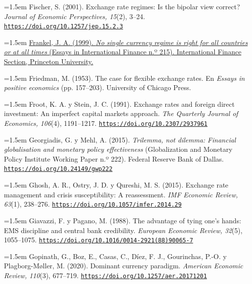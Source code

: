 \documentclass[10pt,a4paper]{article}
\begin{document}
\noindent\hangindent=1.5em Fischer, S. (2001). Exchange rate regimes: Is the bipolar view correct? \textit{Journal of Economic Perspectives, 15}(2), 3--24. \href{https://doi.org/10.1257/jep.15.2.3}{\nolinkurl{https://doi.org/10.1257/jep.15.2.3}}

\noindent\hangindent=1.5em \href{https://scholar.harvard.edu/sites/scholar.harvard.edu/files/frankel/files/nosingleexrrfprinctne215.pdf}{Frankel, J. A. (1999). \textit{No single currency regime is right for all countries or at all times} (Essays in International Finance n.º 215). International Finance Section, Princeton University.}

\noindent\hangindent=1.5em Friedman, M. (1953). The case for flexible exchange rates. En \textit{Essays in positive economics} (pp. 157--203). University of Chicago Press.

\noindent\hangindent=1.5em Froot, K. A. y Stein, J. C. (1991). Exchange rates and foreign direct investment: An imperfect capital markets approach. \textit{The Quarterly Journal of Economics, 106}(4), 1191--1217. \href{https://doi.org/10.2307/2937961}{\nolinkurl{https://doi.org/10.2307/2937961}}

\noindent\hangindent=1.5em Georgiadis, G. y Mehl, A. (2015). \textit{Trilemma, not dilemma: Financial globalisation and monetary policy effectiveness} (Globalization and Monetary Policy Institute Working Paper n.º 222). Federal Reserve Bank of Dallas. \href{https://doi.org/10.24149/gwp222}{\nolinkurl{https://doi.org/10.24149/gwp222}}

\noindent\hangindent=1.5em Ghosh, A. R., Ostry, J. D. y Qureshi, M. S. (2015). Exchange rate management and crisis susceptibility: A reassessment. \textit{IMF Economic Review, 63}(1), 238--276. \href{https://doi.org/10.1057/imfer.2014.29}{\nolinkurl{https://doi.org/10.1057/imfer.2014.29}}

\noindent\hangindent=1.5em Giavazzi, F. y Pagano, M. (1988). The advantage of tying one's hands: EMS discipline and central bank credibility. \textit{European Economic Review, 32}(5), 1055--1075. \href{https://doi.org/10.1016/0014-2921(88)90065-7}{\nolinkurl{https://doi.org/10.1016/0014-2921(88)90065-7}}

\noindent\hangindent=1.5em Gopinath, G., Boz, E., Casas, C., Díez, F. J., Gourinchas, P.-O. y Plagborg-M{\o}ller, M. (2020). Dominant currency paradigm. \textit{American Economic Review, 110}(3), 677--719. \href{https://doi.org/10.1257/aer.20171201}{\nolinkurl{https://doi.org/10.1257/aer.20171201}}
\end{document}
